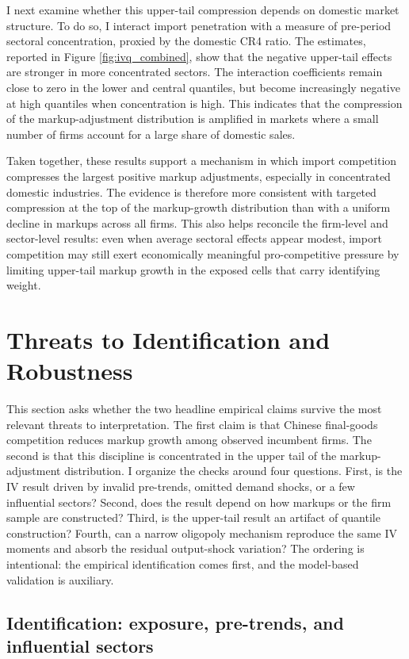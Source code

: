 ﻿\documentclass[12pt]{article}
\begin{document}
I next examine whether this upper-tail compression depends on domestic market structure. To do so, I interact import penetration with a measure of pre-period sectoral concentration, proxied by the domestic CR4 ratio. The estimates, reported in Figure \ref{fig:ivq_combined}, show that the negative upper-tail effects are stronger in more concentrated sectors. The interaction coefficients remain close to zero in the lower and central quantiles, but become increasingly negative at high quantiles when concentration is high. This indicates that the compression of the markup-adjustment distribution is amplified in markets where a small number of firms account for a large share of domestic sales.

Taken together, these results support a mechanism in which import competition compresses the largest positive markup adjustments, especially in concentrated domestic industries. The evidence is therefore more consistent with targeted compression at the top of the markup-growth distribution than with a uniform decline in markups across all firms. This also helps reconcile the firm-level and sector-level results: even when average sectoral effects appear modest, import competition may still exert economically meaningful pro-competitive pressure by limiting upper-tail markup growth in the exposed cells that carry identifying weight.

\section{Threats to Identification and Robustness}

This section asks whether the two headline empirical claims survive the most relevant threats to interpretation. The first claim is that Chinese final-goods competition reduces markup growth among observed incumbent firms. The second is that this discipline is concentrated in the upper tail of the markup-adjustment distribution. I organize the checks around four questions. First, is the IV result driven by invalid pre-trends, omitted demand shocks, or a few influential sectors? Second, does the result depend on how markups or the firm sample are constructed? Third, is the upper-tail result an artifact of quantile construction? Fourth, can a narrow oligopoly mechanism reproduce the same IV moments and absorb the residual output-shock variation? The ordering is intentional: the empirical identification comes first, and the model-based validation is auxiliary.

\subsection{Identification: exposure, pre-trends, and influential sectors}
\end{document}
